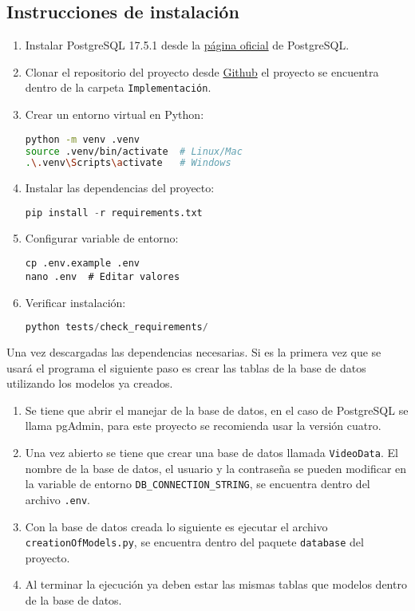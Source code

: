 	\subsection{Instrucciones de instalaci\'on}
	\begin{enumerate}
		\item Instalar PostgreSQL 17.5.1 desde la \href{https://www.postgresql.org/download/}{p\'agina oficial} de PostgreSQL.
		\item Clonar el repositorio del proyecto desde \href{https://github.com/Ic3manMtz/Servicio-Social.git}{Github} el proyecto se encuentra dentro de la carpeta \texttt{Implementaci\'on}.
		\item Crear un entorno virtual en Python:
		\begin{lstlisting}[language=bash]
python -m venv .venv
source .venv/bin/activate  # Linux/Mac
.\.venv\Scripts\activate   # Windows
		\end{lstlisting}
		\item Instalar las dependencias del proyecto:
		\begin{lstlisting}[language=python]
pip install -r requirements.txt
		\end{lstlisting}
		\item Configurar variable de entorno:
		\begin{lstlisting}
cp .env.example .env
nano .env  # Editar valores
		\end{lstlisting}
		\item Verificar instalaci\'on:
		\begin{lstlisting}[language=python]
python tests/check_requirements/
		\end{lstlisting}
	\end{enumerate}

\noindent Una vez descargadas las dependencias necesarias. Si es la primera vez que se usará el programa el siguiente paso es crear las tablas de la base de datos utilizando los modelos ya creados.
\begin{enumerate}
	\item Se tiene que abrir el manejar de la base de datos, en el caso de PostgreSQL se llama pgAdmin, para este proyecto se recomienda usar la versión cuatro.
	\item Una vez abierto se tiene que crear una base de datos llamada \texttt{VideoData}. El nombre de la base de datos, el usuario y la contraseña se pueden modificar en la variable de entorno \texttt{DB\_CONNECTION\_STRING}, se encuentra dentro del archivo \texttt{.env}.
	\item Con la base de datos creada lo siguiente es ejecutar el archivo \texttt{creationOfModels.py}, se encuentra dentro del paquete \texttt{database} del proyecto.
	\item Al terminar la ejecución ya deben estar las mismas tablas que modelos dentro de la base de datos.
\end{enumerate}
